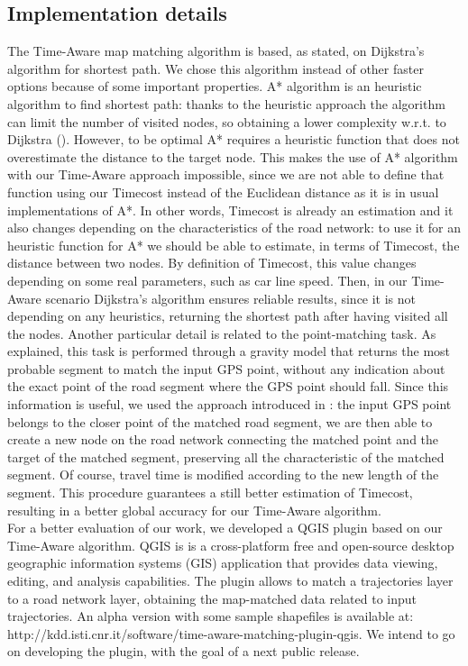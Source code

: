 \documentclass[5p]{elsarticle}
\begin{document}
\subsection{Implementation details}
The Time-Aware map matching algorithm is based, as stated, on Dijkstra's algorithm for shortest path. We chose this algorithm instead of other faster options because of some important properties. A* algorithm is an heuristic algorithm
to find shortest path: thanks to the heuristic approach the algorithm can limit the number of visited nodes, so obtaining a lower complexity w.r.t. to Dijkstra (). However, to be optimal A* requires a heuristic function that does not overestimate the distance to the target node. This makes
the use of A* algorithm with our Time-Aware approach impossible, since we are not able to define that function using our Timecost instead of the Euclidean distance as it is in usual implementations of A*. In other words, Timecost is already
an estimation and it also changes depending on the characteristics of the road network: to use it for an heuristic function for A* we should be able to estimate, in terms of Timecost, the distance between two nodes. 
By definition of Timecost, 
this value changes depending on some real parameters, such as car line speed. Then, in our Time-Aware scenario Dijkstra's algorithm ensures reliable results, since it is not 
depending on any heuristics, returning the shortest path after 
having visited all the nodes. Another particular detail is related to the point-matching task. As explained, this task is performed through a gravity model that returns the 
most probable segment to match the input GPS point, without any indication
about the exact point of the road segment where the GPS point should fall. Since this information is useful, we used the approach introduced in \cite{giovannini2011novel}: the 
input GPS point belongs to the closer point of the matched road
segment, we are then able to create a new node on the road network connecting the matched point and the target of the matched segment, preserving all the characteristic of the matched segment. 
Of course, travel time is modified according to the new length of the segment. This procedure guarantees a still better estimation of Timecost, resulting in a better global accuracy for our Time-Aware algorithm. \\
For a better evaluation of our work, we developed a QGIS plugin based on our Time-Aware algorithm. QGIS is  is a cross-platform free and open-source desktop geographic information systems (GIS) application 
that provides data viewing, editing, and analysis capabilities. The plugin allows to match a trajectories layer to a road network layer, obtaining the map-matched
data related to input trajectories. An alpha version with some sample shapefiles is available at: http://kdd.isti.cnr.it/software/time-aware-matching-plugin-qgis. We intend to go on developing the plugin, with the goal
of a next public release.  
\end{document}

